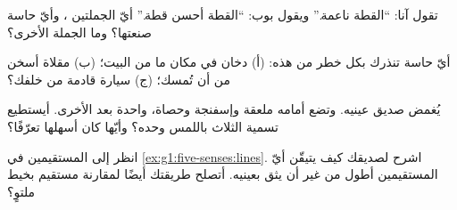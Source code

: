 \begin{exercise}[$\star$]\label{exo:g1:five-senses:6}
تقول آنا: ``القطة ناعمة.'' ويقول بوب: ``القطة أحسن قطة.''
أيّ الجملتين ، وأيّ حاسة صنعتها؟ وما الجملة الأخرى؟
\end{exercise}

\begin{exercise}[$\star$]\label{exo:g1:five-senses:7}
أيّ حاسة تنذرك بكل خطر من هذه: (أ) دخان في مكان ما من البيت؛
(ب) مقلاة أسخن من أن تُمسك؛ (ج) سيارة قادمة من خلفك؟
\end{exercise}

\begin{exercise}[$\star$]\label{exo:g1:five-senses:8}
يُغمض صديق عينيه. وتضع أمامه ملعقة وإسفنجة وحصاة، واحدة بعد
الأخرى. أيستطيع تسمية الثلاث باللمس وحده؟ وأيّها كان أسهلها
تعرّفًا؟
\end{exercise}

\begin{exercise}[$\star\star$]\label{exo:g1:five-senses:9}
انظر إلى المستقيمين في \cref{ex:g1:five-senses:lines}. اشرح
لصديقك كيف يتيقّن أيّ المستقيمين أطول من غير أن يثق بعينيه.
أتصلح طريقتك أيضًا لمقارنة مستقيم بخيط ملتوٍ؟
\end{exercise}
